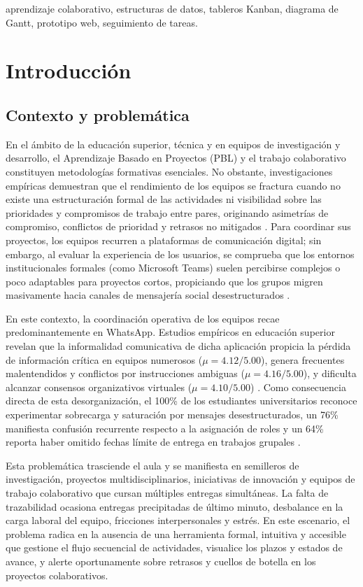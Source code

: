 \documentclass[conference]{IEEEtran}
\begin{document}
\begin{IEEEkeywords}
aprendizaje colaborativo, estructuras de datos, tableros Kanban, diagrama de Gantt, prototipo web, seguimiento de tareas.
\end{IEEEkeywords}

\section{Introducción}
\subsection{Contexto y problemática}
En el ámbito de la educación superior, técnica y en equipos de investigación y desarrollo, el Aprendizaje Basado en Proyectos (PBL) y el trabajo colaborativo constituyen metodologías formativas esenciales. No obstante, investigaciones empíricas demuestran que el rendimiento de los equipos se fractura cuando no existe una estructuración formal de las actividades ni visibilidad sobre las prioridades y compromisos de trabajo entre pares, originando asimetrías de compromiso, conflictos de prioridad y retrasos no mitigados \cite{hussein2021addressing}. Para coordinar sus proyectos, los equipos recurren a plataformas de comunicación digital; sin embargo, al evaluar la experiencia de los usuarios, se comprueba que los entornos institucionales formales (como Microsoft Teams) suelen percibirse complejos o poco adaptables para proyectos cortos, propiciando que los grupos migren masivamente hacia canales de mensajería social desestructurados \cite{sobaih2021responses}.

En este contexto, la coordinación operativa de los equipos recae predominantemente en WhatsApp. Estudios empíricos en educación superior revelan que la informalidad comunicativa de dicha aplicación propicia la pérdida de información crítica en equipos numerosos ($\mu=4.12/5.00$), genera frecuentes malentendidos y conflictos por instrucciones ambiguas ($\mu=4.16/5.00$), y dificulta alcanzar consensos organizativos virtuales ($\mu=4.10/5.00$) \cite{vilches2019limitaciones}. Como consecuencia directa de esta desorganización, el 100\% de los estudiantes universitarios reconoce experimentar sobrecarga y saturación por mensajes desestructurados, un 76\% manifiesta confusión recurrente respecto a la asignación de roles y un 64\% reporta haber omitido fechas límite de entrega en trabajos grupales \cite{akram2024gams}.

Esta problemática trasciende el aula y se manifiesta en semilleros de investigación, proyectos multidisciplinarios, iniciativas de innovación y equipos de trabajo colaborativo que cursan múltiples entregas simultáneas. La falta de trazabilidad ocasiona entregas precipitadas de último minuto, desbalance en la carga laboral del equipo, fricciones interpersonales y estrés. En este escenario, el problema radica en la ausencia de una herramienta formal, intuitiva y accesible que gestione el flujo secuencial de actividades, visualice los plazos y estados de avance, y alerte oportunamente sobre retrasos y cuellos de botella en los proyectos colaborativos.
\end{document}
